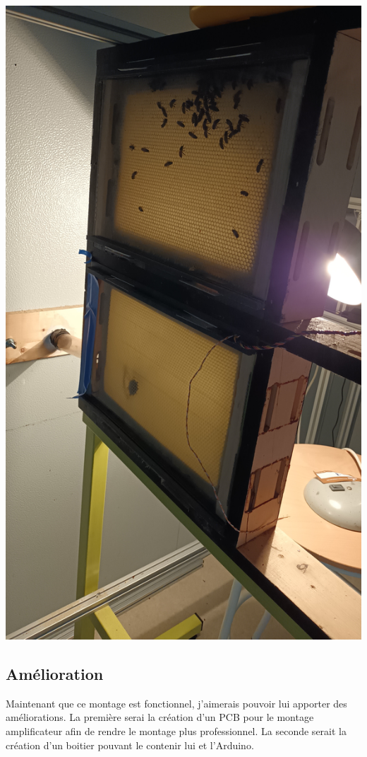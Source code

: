 \documentclass[11pt,french,a4paper]{article}
\begin{document}
\begin{center}
    \includegraphics[scale=0.1,angle=270]{../img/RC.png}
    \label{RC}
\end{center}
\subsection{Amélioration}
Maintenant que ce montage est fonctionnel, j'aimerais pouvoir lui apporter des améliorations. La première serai la création d'un PCB pour le montage amplificateur afin de rendre le montage plus professionnel. La seconde serait la création d'un boitier pouvant le contenir lui et l'Arduino. 
\newpage
\end{document}
